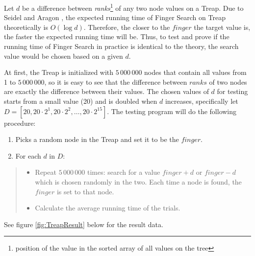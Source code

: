 \documentclass[12pt,english,]{article}
\providecommand{\tightlist}{%
  \setlength{\itemsep}{0pt}\setlength{\parskip}{0pt}}
\begin{document}
Let \(d\) be a difference between \emph{ranks}\footnote{position of the
  value in the sorted array of all values on the tree} of any two node
values on a Treap. Due to Seidel and Aragon \cite{1}, the expected
running time of Finger Search on Treap theoretically is \(O(\log d)\).
Therefore, the closer to the \(finger\) the target value is, the faster
the expected running time will be. Thus, to test and prove if the
running time of Finger Search in practice is identical to the theory,
the search value would be chosen based on a given \(d\).

At first, the Treap is initialized with \(5\,000\,000\) nodes that
contain all values from 1 to \(5\,000\,000\), so it is easy to see that
the difference between \(ranks\) of two nodes are exactly the difference
between their values. The chosen values of \(d\) for testing starts from
a small value (20) and is doubled when \(d\) increases, specifically let
\(D = [20, 20\cdot2^1, 20\cdot2^2, \ldots, 20\cdot2^{15}]\). The testing
program will do the following procedure: \vspace{-4mm}

\begin{enumerate}
\def\labelenumi{\arabic{enumi}.}
\tightlist
\item
  Picks a random node in the Treap and set it to be the \(finger\).
\item
  For each \(d\) in \(D\): \vspace{-4mm}
\end{enumerate}

\begin{quote}
\begin{itemize}
\tightlist
\item
  Repeat \(5\,000\,000\) times: search for a value \(finger + d\) or
  \(finger - d\) which is chosen randomly in the two. Each time a node
  is found, the \(finger\) is set to that node.
\item
  Calculate the average running time of the trials. \vspace{-3mm}
\end{itemize}
\end{quote}

See figure \ref{fig:TreapResult} below for the result data.
\end{document}
